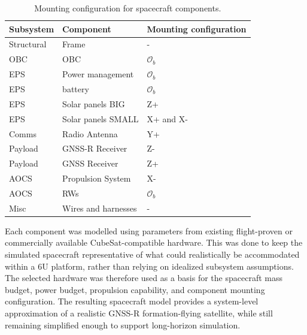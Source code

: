 \begin{table}[htbp]
    \centering
    \caption{Mounting configuration for spacecraft components.}
    \label{tab:mounting_configuration}
    \renewcommand{\arraystretch}{1.15}
    \setlength{\tabcolsep}{4pt}

    \begin{tabular}{lll}
        \hline
        Subsystem & Component & Mounting configuration \\
        \hline

        Structural & Frame & - \\
        OBC & OBC & $\mathcal{O}_b$ \\
        EPS & Power management & $\mathcal{O}_b$ \\
        EPS & battery & $\mathcal{O}_b$ \\
        EPS & Solar panels BIG & Z+ \\
        EPS & Solar panels SMALL & X+ and X- \\
        Comms & Radio Antenna & Y+ \\
        Payload & GNSS-R Receiver & Z- \\
        Payload & GNSS Receiver & Z+ \\
        AOCS & Propulsion System & X- \\
        AOCS & RWs & $\mathcal{O}_b$ \\
        Misc & Wires and harnesses & - \\
        \hline
    \end{tabular}
\end{table}

Each component was modelled using parameters from existing flight-proven or commercially available CubeSat-compatible hardware. This was done to keep the simulated spacecraft representative of what could realistically be accommodated within a 6U platform, rather than relying on idealized subsystem assumptions. The selected hardware was therefore used as a basis for the spacecraft mass budget, power budget, propulsion capability, and component mounting configuration. The resulting spacecraft model provides a system-level approximation of a realistic GNSS-R formation-flying satellite, while still remaining simplified enough to support long-horizon simulation.

